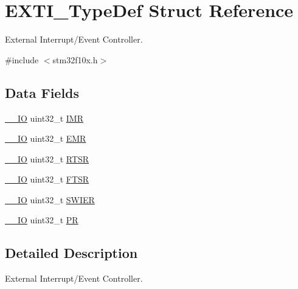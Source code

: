 \hypertarget{struct_e_x_t_i___type_def}{}\section{E\+X\+T\+I\+\_\+\+Type\+Def Struct Reference}
\label{struct_e_x_t_i___type_def}


External Interrupt/\+Event Controller.  




{\ttfamily \#include $<$stm32f10x.\+h$>$}

\subsection*{Data Fields}
\begin{DoxyCompactItemize}
\item 
\mbox{\hyperlink{core__sc300_8h_aec43007d9998a0a0e01faede4133d6be}{\+\_\+\+\_\+\+IO}} uint32\+\_\+t \mbox{\hyperlink{struct_e_x_t_i___type_def_ae845b86e973b4bf8a33c447c261633f6}{I\+MR}}
\item 
\mbox{\hyperlink{core__sc300_8h_aec43007d9998a0a0e01faede4133d6be}{\+\_\+\+\_\+\+IO}} uint32\+\_\+t \mbox{\hyperlink{struct_e_x_t_i___type_def_a6034c7458d8e6030f6dacecf0f1a3a89}{E\+MR}}
\item 
\mbox{\hyperlink{core__sc300_8h_aec43007d9998a0a0e01faede4133d6be}{\+\_\+\+\_\+\+IO}} uint32\+\_\+t \mbox{\hyperlink{struct_e_x_t_i___type_def_a0d952a17455687d6e9053730d028fa1d}{R\+T\+SR}}
\item 
\mbox{\hyperlink{core__sc300_8h_aec43007d9998a0a0e01faede4133d6be}{\+\_\+\+\_\+\+IO}} uint32\+\_\+t \mbox{\hyperlink{struct_e_x_t_i___type_def_aa0f7c828c46ae6f6bc9f66f11720bbe6}{F\+T\+SR}}
\item 
\mbox{\hyperlink{core__sc300_8h_aec43007d9998a0a0e01faede4133d6be}{\+\_\+\+\_\+\+IO}} uint32\+\_\+t \mbox{\hyperlink{struct_e_x_t_i___type_def_a9eae93b6cc13d4d25e12f2224e2369c9}{S\+W\+I\+ER}}
\item 
\mbox{\hyperlink{core__sc300_8h_aec43007d9998a0a0e01faede4133d6be}{\+\_\+\+\_\+\+IO}} uint32\+\_\+t \mbox{\hyperlink{struct_e_x_t_i___type_def_af8d25514079514d38c104402f46470af}{PR}}
\end{DoxyCompactItemize}


\subsection{Detailed Description}
External Interrupt/\+Event Controller. 

